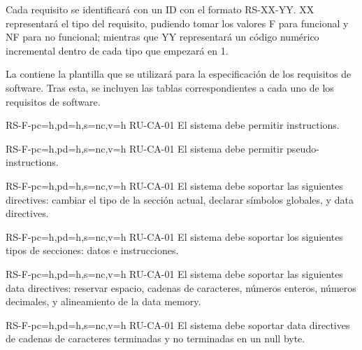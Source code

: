 Cada requisito se identificará con un ID con el formato RS-XX-YY. XX
representará el tipo del requisito, pudiendo tomar los valores F para funcional
y NF para no funcional; mientras que YY representará un código numérico incremental
dentro de cada tipo que empezará en 1.

La  contiene la plantilla que se utilizará para la
especificación de los requisitos de software. Tras esta, se incluyen las tablas
correspondientes a cada uno de los requisitos de software.



\setcounter{i}{1}

\begin{softwareReq}{RS-F-}{pc=h,pd=h,s=nc,v=h}
    {RU-CA-01}
    El sistema debe permitir  \glspl{instruction}.
\end{softwareReq}

\begin{softwareReq}{RS-F-}{pc=h,pd=h,s=nc,v=h}
    {RU-CA-01}
    El sistema debe permitir  \glspl{pseudo-instruction}.
\end{softwareReq}

\begin{softwareReq}{RS-F-}{pc=h,pd=h,s=nc,v=h}
    {RU-CA-01}
    El sistema debe soportar las siguientes \glspl{directive}: cambiar el tipo
    de la sección actual, declarar símbolos globales, y \glspl{data directive}.
\end{softwareReq}

\begin{softwareReq}{RS-F-}{pc=h,pd=h,s=nc,v=h}
    {RU-CA-01}
    El sistema debe soportar los siguientes tipos de secciones: datos e
    instrucciones.
\end{softwareReq}

\begin{softwareReq}{RS-F-}{pc=h,pd=h,s=nc,v=h}
    {RU-CA-01}
    El sistema debe soportar las siguientes \glspl{data directive}: reservar
    espacio, cadenas de caracteres, números enteros, números decimales, y
    alineamiento de la \gls{data memory}.
\end{softwareReq}

\begin{softwareReq}{RS-F-}{pc=h,pd=h,s=nc,v=h}
    {RU-CA-01}
    El sistema debe soportar \glspl{data directive} de cadenas de
    caracteres terminadas y no terminadas en un \gls{null byte}.
\end{softwareReq}

